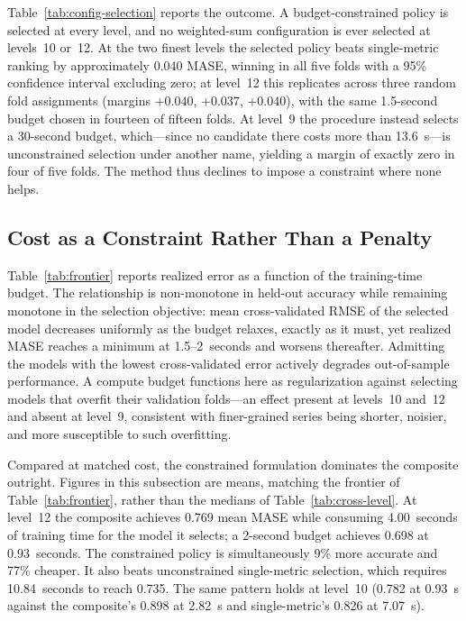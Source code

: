 

Table~\ref{tab:config-selection} reports the outcome. A budget-constrained policy is selected at every level, and no weighted-sum configuration is ever selected at levels~10 or~12. At the two finest levels the selected policy beats single-metric ranking by approximately 0.040 MASE, winning in all five folds with a 95\% confidence interval excluding zero; at level~12 this replicates across three random fold assignments (margins $+0.040$, $+0.037$, $+0.040$), with the same 1.5-second budget chosen in fourteen of fifteen folds. At level~9 the procedure instead selects a 30-second budget, which---since no candidate there costs more than 13.6~s---is unconstrained selection under another name, yielding a margin of exactly zero in four of five folds. The method thus declines to impose a constraint where none helps.

\subsection{Cost as a Constraint Rather Than a Penalty}
Table~\ref{tab:frontier} reports realized error as a function of the training-time budget. The relationship is non-monotone in held-out accuracy while remaining monotone in the selection objective: mean cross-validated RMSE of the selected model decreases uniformly as the budget relaxes, exactly as it must, yet realized MASE reaches a minimum at 1.5--2~seconds and worsens thereafter. Admitting the models with the lowest cross-validated error actively degrades out-of-sample performance. A compute budget functions here as regularization against selecting models that overfit their validation folds---an effect present at levels~10 and~12 and absent at level~9, consistent with finer-grained series being shorter, noisier, and more susceptible to such overfitting.



Compared at matched cost, the constrained formulation dominates the composite outright. Figures in this subsection are means, matching the frontier of Table~\ref{tab:frontier}, rather than the medians of Table~\ref{tab:cross-level}. At level~12 the composite achieves 0.769 mean MASE while consuming 4.00~seconds of training time for the model it selects; a 2-second budget achieves 0.698 at 0.93~seconds. The constrained policy is simultaneously 9\% more accurate and 77\% cheaper. It also beats unconstrained single-metric selection, which requires 10.84~seconds to reach 0.735. The same pattern holds at level~10 (0.782 at 0.93~s against the composite's 0.898 at 2.82~s and single-metric's 0.826 at 7.07~s).

